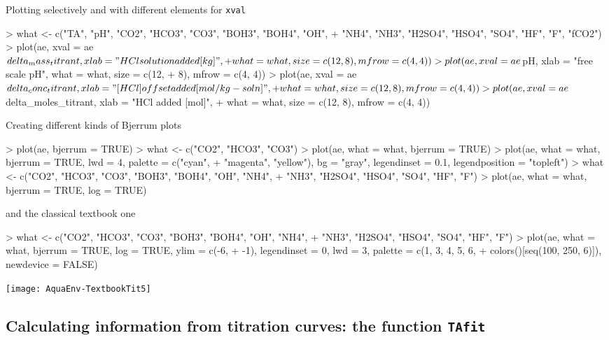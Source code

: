\documentclass[article,nojss]{jss}
\begin{document}
Plotting selectively and with different elements for \texttt{xval}
\begin{Schunk}
\begin{Sinput}
> what <- c("TA", "pH", "CO2", "HCO3", "CO3", "BOH3", "BOH4", "OH", 
+     "NH4", "NH3", "H2SO4", "HSO4", "SO4", "HF", "F", "fCO2")
> plot(ae, xval = ae$delta_mass_titrant, xlab = "HCl solution added [kg]", 
+     what = what, size = c(12, 8), mfrow = c(4, 4))
> plot(ae, xval = ae$pH, xlab = "free scale pH", what = what, size = c(12, 
+     8), mfrow = c(4, 4))
> plot(ae, xval = ae$delta_conc_titrant, xlab = "[HCl] offset added [mol/kg-soln]", 
+     what = what, size = c(12, 8), mfrow = c(4, 4))
> plot(ae, xval = ae$delta_moles_titrant, xlab = "HCl added [mol]", 
+     what = what, size = c(12, 8), mfrow = c(4, 4))
\end{Sinput}
\end{Schunk}



Creating different kinds of Bjerrum plots
\begin{Schunk}
\begin{Sinput}
> plot(ae, bjerrum = TRUE)
> what <- c("CO2", "HCO3", "CO3")
> plot(ae, what = what, bjerrum = TRUE)
> plot(ae, what = what, bjerrum = TRUE, lwd = 4, palette = c("cyan", 
+     "magenta", "yellow"), bg = "gray", legendinset = 0.1, legendposition = "topleft")
> what <- c("CO2", "HCO3", "CO3", "BOH3", "BOH4", "OH", "NH4", 
+     "NH3", "H2SO4", "HSO4", "SO4", "HF", "F")
> plot(ae, what = what, bjerrum = TRUE, log = TRUE)
\end{Sinput}
\end{Schunk}

and the classical textbook one
\begin{Schunk}
\begin{Sinput}
> what <- c("CO2", "HCO3", "CO3", "BOH3", "BOH4", "OH", "NH4", 
+     "NH3", "H2SO4", "HSO4", "SO4", "HF", "F")
> plot(ae, what = what, bjerrum = TRUE, log = TRUE, ylim = c(-6, 
+     -1), legendinset = 0, lwd = 3, palette = c(1, 3, 4, 5, 6, 
+     colors()[seq(100, 250, 6)]), newdevice = FALSE)
\end{Sinput}
\end{Schunk}
\texttt{[image: AquaEnv-TextbookTit5]}




\subsection{Calculating information from titration curves: the function \texttt{TAfit}}
\end{document}
